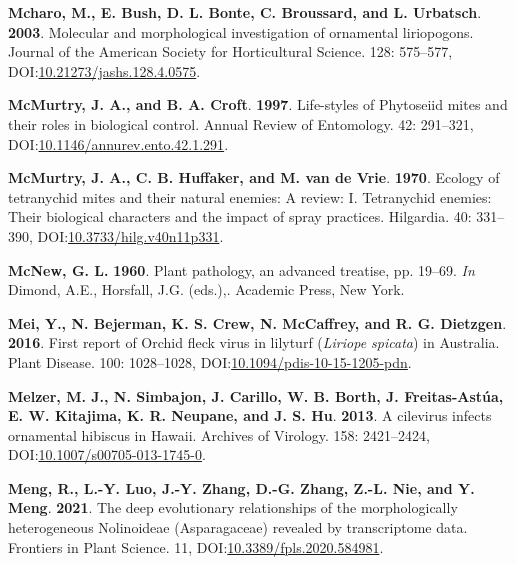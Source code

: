 \documentclass[12pt,final,CPage]{ufthesis}
\newlength{\cslhangindent}
\newenvironment{CSLReferences}[2] %
{%
	\setlength{\parindent}{0pt}
	\ifodd #1 \everypar{\setlength{\hangindent}{\cslhangindent}}\ignorespaces\fi
	\ifnum #2 > 0
	\setlength{\parskip}{#2\baselineskip}
	\fi
}%
{}
\begin{document}
{\begin{CSLReferences}{1}{0}
  \leavevmode{}%
  \textbf{Mcharo, M., E. Bush, D. L. Bonte, C. Broussard, and L. Urbatsch}. \textbf{2003}. Molecular and morphological investigation of ornamental liriopogons. Journal of the American Society for Horticultural Science. 128: 575--577, DOI:\href{https://doi.org/10.21273/jashs.128.4.0575}{10.21273/jashs.128.4.0575}.

  \leavevmode{}%
  \textbf{McMurtry, J. A., and B. A. Croft}. \textbf{1997}. Life-styles of {Phytoseiid} mites and their roles in biological control. Annual Review of Entomology. 42: 291--321, DOI:\href{https://doi.org/10.1146/annurev.ento.42.1.291}{10.1146/annurev.ento.42.1.291}.

  \leavevmode{}%
  \textbf{McMurtry, J. A., C. B. Huffaker, and M. van de Vrie}. \textbf{1970}. Ecology of tetranychid mites and their natural enemies: A review: I. Tetranychid enemies: Their biological characters and the impact of spray practices. Hilgardia. 40: 331--390, DOI:\href{https://doi.org/10.3733/hilg.v40n11p331}{10.3733/hilg.v40n11p331}.

  \leavevmode{}%
  \textbf{McNew, G. L.} \textbf{1960}. Plant pathology, an advanced treatise, pp. 19--69. \emph{In} Dimond, A.E., Horsfall, J.G. (eds.),. Academic Press, New York.

  \leavevmode{}%
  \textbf{Mei, Y., N. Bejerman, K. S. Crew, N. McCaffrey, and R. G. Dietzgen}. \textbf{2016}. First report of {Orchid fleck virus} in lilyturf {(\emph{Liriope spicata})} in {Australia}. Plant Disease. 100: 1028--1028, DOI:\href{https://doi.org/10.1094/pdis-10-15-1205-pdn}{10.1094/pdis-10-15-1205-pdn}.

  \leavevmode{}%
  \textbf{Melzer, M. J., N. Simbajon, J. Carillo, W. B. Borth, J. Freitas-Astúa, E. W. Kitajima, K. R. Neupane, and J. S. Hu}. \textbf{2013}. A cilevirus infects ornamental hibiscus in {Hawaii}. Archives of Virology. 158: 2421--2424, DOI:\href{https://doi.org/10.1007/s00705-013-1745-0}{10.1007/s00705-013-1745-0}.

  \leavevmode{}%
  \textbf{Meng, R., L.-Y. Luo, J.-Y. Zhang, D.-G. Zhang, Z.-L. Nie, and Y. Meng}. \textbf{2021}. The deep evolutionary relationships of the morphologically heterogeneous {Nolinoideae} ({Asparagaceae}) revealed by transcriptome data. Frontiers in Plant Science. 11, DOI:\href{https://doi.org/10.3389/fpls.2020.584981}{10.3389/fpls.2020.584981}.


\end{CSLReferences}}
\end{document}
